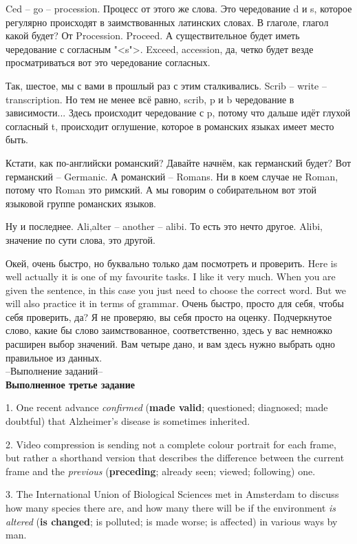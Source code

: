 \documentclass[main.tex]{subfiles}
\begin{document}
Ced -- go -- procession.
Процесс от этого же слова.
Это чередование d и s, которое регулярно происходят в заимствованных латинских словах.
В глаголе, глагол какой будет? От Procession.
Proceed.
А существительное будет иметь чередование с согласным "<s">.
Exceed, accession, да, четко будет везде просматриваться вот это чередование согласных.


Так, шестое, мы с вами в прошлый раз с этим сталкивались.
Scrib -- write -- transcription.
Но тем не менее всё равно, scrib, p и b чередование в зависимости...
Здесь происходит чередование с p, потому что дальше идёт глухой согласный t, происходит оглушение, которое в романских языках имеет место быть.

Кстати, как по-английски романский?
Давайте начнём, как германский будет?
Вот германский -- Germanic.
А романский -- Romans.
Ни в коем случае не Roman, потому что Roman это римский.
А мы говорим о собирательном вот этой языковой группе романских языков.

Ну и последнее.
Ali,alter -- another -- alibi.
То есть это нечто другое.
Alibi, значение по сути слова, это другой.

Окей, очень быстро, но буквально только дам посмотреть и проверить.
Here is well actually it is one of my favourite tasks.
I like it very much.
When you are given the sentence, in this case you just need to choose the correct word.
But we will also practice it in terms of grammar.
Очень быстро, просто для себя, чтобы себя проверить, да?
Я не проверяю, вы себя просто на оценку.
Подчеркнутое слово, какие бы слово заимствованное, соответственно, здесь у вас немножко расширен выбор значений.
Вам четыре дано, и вам здесь нужно выбрать одно правильное из данных.
\\

--Выполнение заданий--
\\

\textbf{Выполненное третье задание}

1. One recent advance \textit{confirmed} (\textbf{made valid}; questioned; diagnosed; made doubtful) that Alzheimer's disease is sometimes inherited.

2. Video compression is sending not a complete colour portrait for each frame, but rather a shorthand version that describes the difference between the current frame and the \textit{previous} (\textbf{preceding}; already seen; viewed; following) one.

3. The International Union of Biological Sciences met in Amsterdam to discuss how many species there are, and how many there will be if the environment \textit{is altered} (\textbf{is changed}; is polluted; is made worse; is affected) in various ways by man. 
\end{document}

